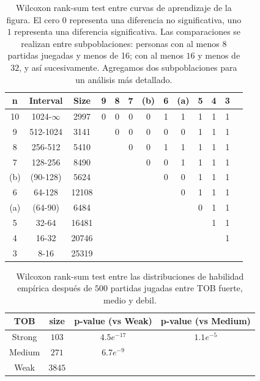 \documentclass[a4paper,11pt]{book}
\theoremstyle{definition}
\begin{document}
\begin{table}[H]
\centering
\scriptsize
\begin{tabular}{cc|ccccccccccc}

  \hline
n & Interval & Size & 9 & 8 & 7 & (b) & 6 & (a)  & 5 & 4 & 3 \\
  \hline
10 & 1024-$\infty$ & 2997   & 0 & 0 & 0 & 0 & 1 & 1 & 1 & 1 & 1 \\
9 & 512-1024 & 3141   &  & 0 & 0 & 0 & 0 & 0 & 1 & 1 & 1 \\
8 & 256-512 & 5410   &  &  & 0 & 0 & 1 & 1 & 1 & 1 & 1 \\
7 & 128-256 & 8490   &  &  &  & 0 & 0 & 1 & 1 & 1 & 1 \\
(b) & (90-128) & 5624   &  &  &  &  & 0 & 0 & 1 & 1 & 1 \\
6 & 64-128 & 12108   &  &  &  &  &  & 0 & 1 & 1 & 1 \\
(a) & (64-90) & 6484   &  &  &  &  &  &  & 0 & 1 & 1 \\
5 & 32-64 & 16481   &  &  &  &  &  &  &  & 1 & 1 \\
4 & 16-32 & 20746   &  &  &  &  &  &  &  &  & 1 \\
3 & 8-16 & 25319   &  &  &  &  &  &  &  &  &  \\
   \hline

\end{tabular}
\caption{
Wilcoxon rank-sum test entre curvas de aprendizaje de la figura.
El cero $0$ representa una diferencia no significativa, uno $1$ representa una diferencia significativa.
Las comparaciones se realizan entre subpoblaciones: personas con al menos 8 partidas juegadas y menos de 16; con al menos $16$ y menos de $32$, y así sucesivamente.
Agregamos dos subpoblaciones para un análisis más detallado.
}
  \label{learningskill_curve_wilcoxon}
\end{table}



\begin{table}[H]
\centering
\begin{tabular}{cccc}
  \hline
  TOB & size & p-value (vs Weak) & p-value (vs Medium) \\
  \hline
Strong & $103$ & $4.5e^{-17}$ &  $1.1e^{-5}$\\
Medium & $271$ & $6.7e^{-9}$ \\
Weak & $3845$ &  \\
\hline
\end{tabular}
\caption{Wilcoxon rank-sum test entre las distribuciones de habilidad empírica después de $500$ partidas jugadas entre TOB fuerte, medio y debil.}
\label{learningskill_team_hasta4team_wilcoxon}
\end{table}
\end{document}

